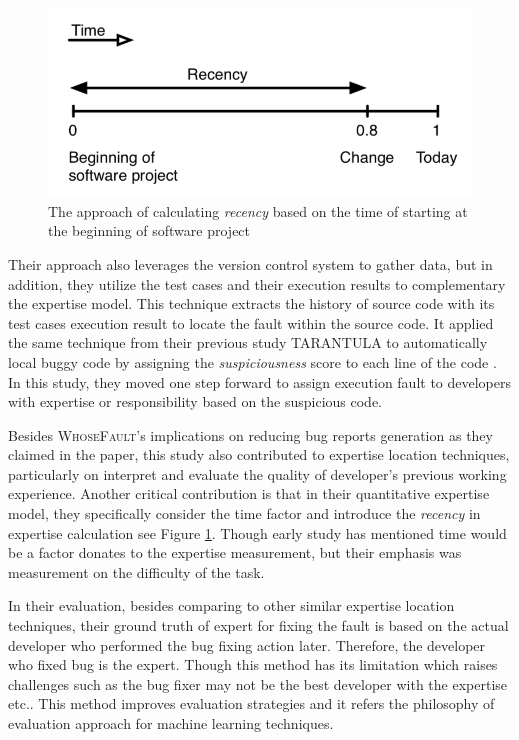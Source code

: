 \begin{figure}
\includegraphics[width = 0.5\columnwidth]{recency.png}
\centering
\caption{The approach of calculating \textit{recency} based on the time of starting at the beginning of software project \cite{servant2012whosefault}}
\label{recency}
\end{figure}

Their approach also leverages the version control system to gather data, but in addition, they utilize the test cases and their execution results to complementary the expertise model. This technique extracts the history of source code with its test cases execution result to locate the fault within the source code. It applied the same technique from their previous study \textsc{TARANTULA} to automatically local buggy code by assigning the \textit{suspiciousness} score to each line of the code \cite{jones2002visualization}. In this study, they moved one step forward to assign execution fault to developers with expertise or responsibility based on the suspicious code.

Besides \textsc{WhoseFault}'s implications on reducing bug reports generation as they claimed in the paper, this study also contributed to expertise location techniques, particularly on interpret and evaluate the quality of developer's previous working experience. Another critical contribution is that in their quantitative expertise model, they specifically consider the time factor and introduce the \textit{recency} in expertise calculation see Figure \ref{recency}. Though early study \cite{mockus2002expertise} has mentioned time would be a factor donates to the expertise measurement, but their emphasis was measurement on the difficulty of the task. 

In their evaluation, besides comparing to other similar expertise location techniques, their ground truth of expert for fixing the fault is based on the actual developer who performed the bug fixing action later. Therefore, the developer who fixed bug is the expert. Though this method has its limitation which raises challenges such as the bug fixer may not be the best developer with the expertise etc.. This method improves evaluation strategies and it refers the philosophy of evaluation approach for machine learning techniques. 

